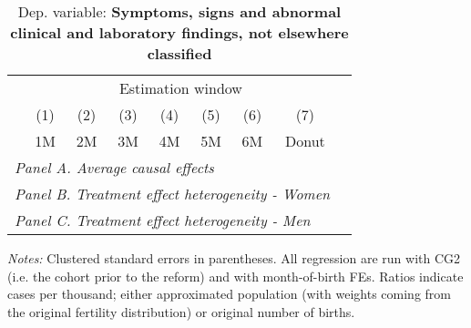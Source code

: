  \begin{table}[H] \begin{threeparttable} \centering \caption{Dep. variable: \textbf{Symptoms, signs and abnormal clinical and laboratory findings, not elsewhere classified}} {\def\sym#1{\ifmmode^{#1}\else\(^{#1}\)\fi} \begin{tabular}{l*{8}{c}} \toprule & \multicolumn{7}{c}{Estimation window} \\ \cmidrule(lr){2-8}
            &\multicolumn{1}{c}{(1)}&\multicolumn{1}{c}{(2)}&\multicolumn{1}{c}{(3)}&\multicolumn{1}{c}{(4)}&\multicolumn{1}{c}{(5)}&\multicolumn{1}{c}{(6)}&\multicolumn{1}{c}{(7)}\\
            &\multicolumn{1}{c}{1M}&\multicolumn{1}{c}{2M}&\multicolumn{1}{c}{3M}&\multicolumn{1}{c}{4M}&\multicolumn{1}{c}{5M}&\multicolumn{1}{c}{6M}&\multicolumn{1}{c}{Donut}\\
\midrule
 \multicolumn{8}{l}{\emph{Panel A. Average causal effects}} \\       \midrule\multicolumn{8}{l}{\emph{Panel B. Treatment effect heterogeneity - Women}} \\       \midrule\multicolumn{8}{l}{\emph{Panel C. Treatment effect heterogeneity - Men}} \\       
\bottomrule \end{tabular} } \begin{tablenotes} \item \scriptsize \emph{Notes:} Clustered standard errors in parentheses. All regression are run with CG2 (i.e. the cohort prior to the reform) and with month-of-birth FEs. Ratios indicate cases per thousand; either approximated population (with weights coming from the original fertility distribution) or original number of births. \end{tablenotes} \end{threeparttable} \end{table} 
